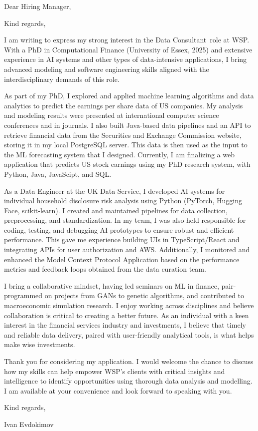 \documentclass[11pt,a4paper,sans]{moderncv}
\newcommand{\positionname}{Data Consultant}
\newcommand{\companyfull}{ WSP }
\newcommand{\companyshort}{WSP}
\begin{document}
\date{\today}
\opening{Dear Hiring Manager,}
\closing{Kind regards,}

\makelettertitle

I am writing to express my strong interest in the \positionname~role at \companyshort. With a PhD in Computational Finance (University of Essex, 2025) and extensive experience in AI systems and other types of data-intensive applications, I bring advanced modeling and software engineering skills aligned with the interdisciplinary demands of this role.

As part of my PhD, I explored and applied machine learning algorithms and data analytics to predict the earnings per share data of US companies. My analysis and modeling results were presented at international computer science conferences and in journals. I also built Java-based data pipelines and an API to retrieve financial data from the Securities and Exchange Commission website, storing it in my local PostgreSQL server. This data is then used as the input to the ML forecasting system that I designed. Currently, I am finalizing a web application that predicts US stock earnings using my PhD research system, with Python, Java, JavaScipt, and SQL.

As a Data Engineer at the UK Data Service, I developed AI systems for individual household disclosure risk analysis using Python (PyTorch, Hugging Face, scikit-learn). I created and maintained pipelines for data collection, preprocessing, and standardization. In my team, I was also held responsible for coding, testing, and debugging AI prototypes to ensure robust and efficient performance. This gave me experience building UIs in TypeScript/React and integrating APIs for user authorization and AWS. Additionally, I monitored and enhanced the Model Context Protocol Application based on the performance metrics and feedback loops obtained from the data curation team.

I bring a collaborative mindset, having led seminars on ML in finance, pair-programmed on projects from GANs to genetic algorithms, and contributed to macroeconomic simulation research. I enjoy working across disciplines and believe collaboration is critical to creating a better future. As an individual with a keen interest in the financial services industry and investments, I believe that timely and reliable data delivery, paired with user-friendly analytical tools, is what helps make wise investments.

Thank you for considering my application. I would welcome the chance to discuss how my skills can help empower \companyshort's clients with critical insights and intelligence to identify opportunities using thorough data analysis and modelling. I am available at your convenience and look forward to speaking with you.

\vspace{0.25cm}
Kind regards,

Ivan Evdokimov
\end{document}
